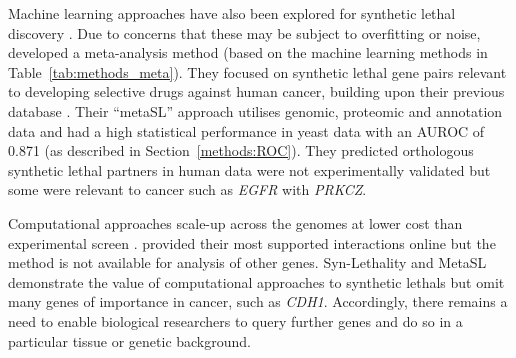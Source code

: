 Machine learning approaches have also been explored for \gls{synthetic lethal} discovery \citep{Babyak2004, Lee2009}. Due to concerns that these may be subject to overfitting or noise, \citet{Wu2014} developed a meta-analysis method (based on the machine learning methods in Table~\ref{tab:methods_meta}). They focused on \gls{synthetic lethal} gene pairs relevant to developing selective drugs against human cancer, building upon their previous database \citep{Li2014}. %
Their ``metaSL'' approach utilises \gls{genomic}, proteomic and annotation data %
and had a high statistical performance in yeast data with an \gls{AUROC} of 0.871 (as described in Section~\ref{methods:ROC}). They predicted orthologous \gls{synthetic lethal} partners in human data were not experimentally validated but some were relevant to cancer such as \textit{EGFR} with \textit{PRKCZ}.

Computational approaches scale-up across the \glspl{genome} at lower cost than experimental screen \citep{Wu2014}. \citet{Wu2014} provided their most supported interactions online but the method is not available for analysis of other genes.  %
Syn-Lethality \citep{Li2014} and MetaSL \citep{Wu2014} demonstrate the value of computational approaches to \glspl{synthetic lethal} but omit many genes of importance in cancer, such as \textit{CDH1}. Accordingly, there remains a need to enable biological researchers to query further genes and do so in a particular tissue or genetic background. 

